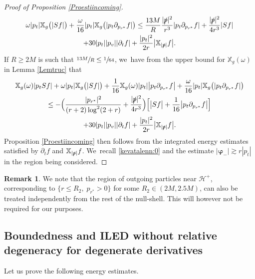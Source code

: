 \documentclass[10pt]{amsart}
\theoremstyle{plain}
\theoremstyle{definition}
\newtheorem{remark}[proposition]{Remark}
\newcommand\T{{\mathbb{X}}}
\begin{document}
\begin{proof}[Proof of Proposition \ref{Proestiincoming}]
\begin{multline*}
\omega|p_t| \T_g\bigl(|Sf| \bigr)+\frac{\omega}{16} |p_t| \T_g\bigl(|p_t \partial_{p_{r^*}}f| \bigr) \leq \frac{13M}{R} \frac{ |\slashed{p}|^2}{r^3} |p_t \partial_{p_{r^*}} f |+\frac{|\slashed{p}|^2}{4r^3 } |Sf| \\
+30 |p_t||p_v||\partial_t f| +\frac{|p_{t}|^2}{2r } \big|\T_{|\slashed{p}|} f \big|.
\end{multline*}
If $R\geq 2M$ is such that $\sfrac{13M}{R} \leq \sfrac{1}{64}$, we~have from the upper bound for $\T_g(\omega)$ in Lemma \ref{Lemtruc} that
\begin{multline} \label{eq:forRk641}
\T_g(\omega) |p_t Sf| +\omega|p_t| \T_g\bigl(|Sf| \bigr)+ \frac{1}{16}\T_g(\omega) |p_t| \big|p_t \partial_{p_{r^*}}f \big| +\frac{\omega}{16}|p_t| \T_g\bigl(|p_t \partial_{p_{r^*}}f| \bigr) \\
\leq -\Bigl(\frac{|p_{r^*}|^2}{(r+2)\log^2(2+r)}+\frac{|\slashed{p}|^2}{4r^3} \Bigr)  \Bigl[\big|S f \big| + \frac{1}{16}\big|p_t \partial_{p_{r^*}} f \big| \Bigr]\\
+30 |p_t||p_v||\partial_t f| +\frac{|p_{t}|^2}{2r } \big|\T_{|\slashed{p}|} f \big|.
\end{multline}
Proposition \ref{Proestiincoming} then follows from the integrated energy estimates satisfied by $\partial_t f$ and $\T_{|\slashed{p}|} f$. We~recall \eqref{kevatalenn:0} and the estimate $|\pmb{\varphi}_-| \gtrsim r |p_t|$ in the region being considered.
\end{proof}

\begin{remark}
We note that the region of outgoing particles near $\mathcal{H}^+$, corresponding to $\{ r \leq R_2, \; p_{r^*} >0 \}$ for some $R_2 \in (2M,2.5M)$, can also be treated independently from the rest of the null-shell. This will however not be required for our purposes.
\end{remark}

\subsection{Boundedness and ILED without relative degeneracy for degenerate derivatives}\label{Subsec73}

Let us prove the following energy estimates.
\end{document}

